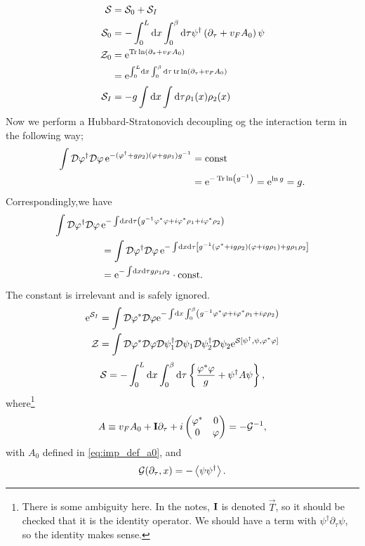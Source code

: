 \begin{align*}
	\mathcal{S} &= \mathcal{S}_0 + \mathcal{S}_I \\
	\mathcal{S}_0 &= -\int_0^L\dd{x}\int_0^\beta\dd\tau\psi^\dagger\left(\partial_\tau+ v_FA_0\right)\psi \\
	\mathcal{Z}_0 &= \mathrm{e}^{\Tr\ln(\partial_\tau + v_FA_0)} \\
	&= \mathrm{e}^{\int_0^L\dd{x}\int_0^\beta\dd\tau\tr\ln\left(\partial_\tau+ v_FA_0\right)} \\
	\mathcal{S}_I &= -g\int\dd{x}\int\dd\tau\rho_1(x)\rho_2(x)
\end{align*}
Now we perform a Hubbard-Stratonovich decoupling og the interaction term in the following way;
\begin{align*}
\int\mathcal{D}\varphi^{\dagger}\mathcal{D}\varphi\,\mathrm{e}^{-(\varphi^{\dagger} + g\rho_2)(\varphi + g\rho_1)g^{-1}} &= \text{const} \\
&= \mathrm{e}^{-\Tr\ln(g^{-1})} = \mathrm{e}^{\ln g} = g.
\end{align*}
Correspondingly,we have
\begin{align*}
\int\mathcal{D}\varphi^{\dagger}\mathcal{D}\varphi\,&\mathrm{e}^{-\int\dd{x}\dd \tau\left(g^{-1}\varphi^*\varphi+i\varphi^*\rho_1 + i\varphi^*\rho_2\right)} \\
&= \int\mathcal{D}\varphi^{\dagger}\mathcal{D}\varphi\,\mathrm{e}^{-\int\dd{x}\dd \tau\left[g^{-1}(\varphi^* + ig\rho_2)(\varphi + ig\rho_1) + g\rho_1\rho_2\right]} \\
&= \mathrm{e}^{-\int\dd{x}\dd \tau g\rho_1\rho_2}\cdot \text{const}.
\end{align*}
The constant is irrelevant and is safely ignored.
\begin{align}
\mathrm{e}^{\mathcal{S}_I} &= \int\mathcal{D}\varphi^*\mathcal{D}\varphi\mathrm{e}^{-\int\dd{x}\int_0^\beta\left(g^{-1}\varphi^*\varphi+i\varphi^*\rho_1 + i\varphi\rho_2\right)} \\
\mathcal{Z} &= \int\mathcal{D}\varphi^*\mathcal{D}\varphi\mathcal{D}\psi_1^\dagger\mathcal{D}\psi_1\mathcal{D}\psi_2^\dagger\mathcal{D}\psi_2\mathrm{e}^{\mathcal{S}[\psi^\dagger,\psi,\varphi^*\varphi]}
\end{align}
\begin{equation}
\label{eq:action_1d}
\mathcal{S}= -\int_0^L\dd{x} \int_0^\beta \dd\tau \left\{\frac{\varphi^*\varphi}{g} +  \psi^\dagger A\psi\right\},
\end{equation}
where\footnote{There is some ambiguity here. In the notes, $\vb{I}$ is denoted $\vec{T}$, so it should be checked that it is the identity operator. We should have a term with $\psi^\dagger\partial_\tau\psi$, so the identity makes sense.}
\begin{equation}
	A \equiv v_FA_0 + \vb{I}\partial_\tau + i
	\begin{pmatrix}
	\varphi^* & 0 \\
	0 & \varphi
	\end{pmatrix} = -\mathcal{G}^{-1},
\end{equation}
with $A_0$ defined in \eqref{eq:imp_def_a0}, and
\begin{equation}
	\mathcal{G}(\partial_\tau, x) = -\ev{\psi\psi^\dagger}.
\end{equation}

